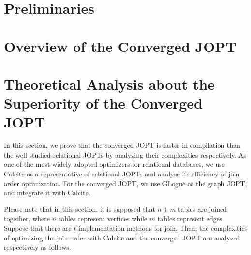 \documentclass[sigconf, nonacm]{acmart}
\begin{document}
\section{Preliminaries}
\label{sec:preliminaries}


\section{Overview of the Converged JOPT}
\label{sec:overview}


\section{Theoretical Analysis about the Superiority of the Converged JOPT}
\label{sec:theoretical-analysis}

In this section, we prove that the converged JOPT is faster in compilation than the well-studied relational JOPTs by analyzing their complexities respectively.
As one of the most widely adopted optimizers for relational databases, we use Calcite \cite{calcite,columbia} as a representative of relational JOPTs and analyze its efficiency of join order optimization.
For the converged JOPT, we use GLogue \cite{GLogS} as the graph JOPT, and integrate it with Calcite.

Please note that in this section, it is supposed that $n + m$ tables are joined together, where $n$ tables represent vertices while $m$ tables represent edges.
Suppose that there are $t$ implementation methods for join.
Then, the complexities of optimizing the join order with Calcite and the converged JOPT are analyzed respectively as follows.
\end{document}

